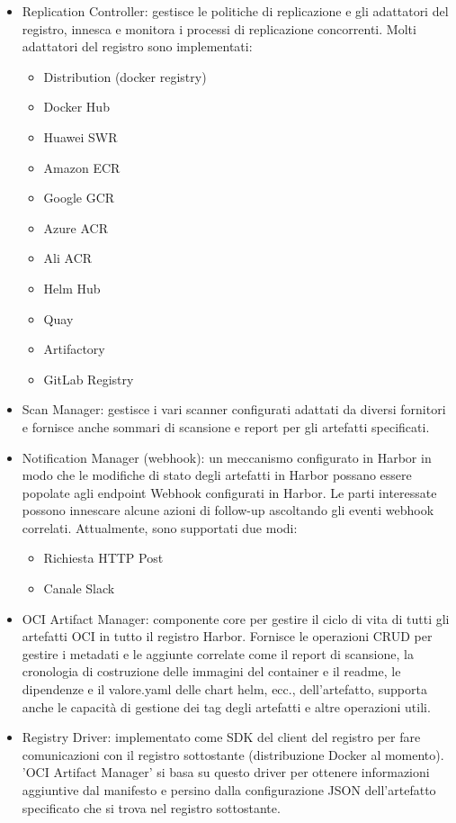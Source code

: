 \documentclass[12pt]{report}
\begin{document}
\begin{itemize}
  \item Replication Controller: gestisce le politiche di replicazione e gli adattatori del registro, innesca e monitora i processi di replicazione concorrenti. Molti adattatori del registro sono implementati:
  \begin{itemize}
    \item Distribution (docker registry)
    \item Docker Hub
    \item Huawei SWR
    \item Amazon ECR
    \item Google GCR
    \item Azure ACR
    \item Ali ACR
    \item Helm Hub
    \item Quay
    \item Artifactory
    \item GitLab Registry
  \end{itemize}
  \item Scan Manager: gestisce i vari scanner configurati adattati da diversi fornitori e fornisce anche sommari di scansione e report per gli artefatti specificati.
  \item Notification Manager (webhook): un meccanismo configurato in Harbor in modo che le modifiche di stato degli artefatti in Harbor possano essere popolate agli endpoint Webhook configurati in Harbor. Le parti interessate possono innescare alcune azioni di follow-up ascoltando gli eventi webhook correlati. Attualmente, sono supportati due modi:
  \begin{itemize}
    \item Richiesta HTTP Post
    \item Canale Slack
  \end{itemize}
  \item OCI Artifact Manager: componente core per gestire il ciclo di vita di tutti gli artefatti OCI in tutto il registro Harbor. Fornisce le operazioni CRUD per gestire i metadati e le aggiunte correlate come il report di scansione, la cronologia di costruzione delle immagini del container e il readme, le dipendenze e il valore.yaml delle chart helm, ecc., dell'artefatto, supporta anche le capacità di gestione dei tag degli artefatti e altre operazioni utili.
  \item Registry Driver: implementato come SDK del client del registro per fare comunicazioni con il registro sottostante (distribuzione Docker al momento). 'OCI Artifact Manager' si basa su questo driver per ottenere informazioni aggiuntive dal manifesto e persino dalla configurazione JSON dell'artefatto specificato che si trova nel registro sottostante.
\end{itemize}
\end{document}
